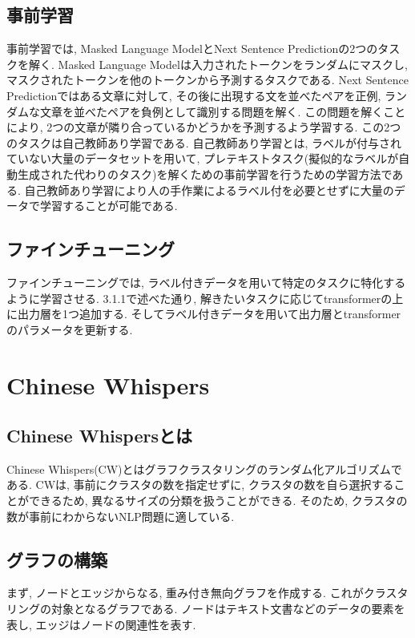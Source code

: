 \subsection{事前学習}
事前学習では, Masked Language ModelとNext Sentence Predictionの2つのタスクを解く. Masked Language Modelは入力されたトークンをランダムにマスクし, マスクされたトークンを他のトークンから予測するタスクである. Next Sentence Predictionではある文章に対して, その後に出現する文を並べたペアを正例, ランダムな文章を並べたペアを負例として識別する問題を解く. この問題を解くことにより, 2つの文章が隣り合っているかどうかを予測するよう学習する. 
この2つのタスクは自己教師あり学習である. 自己教師あり学習とは, ラベルが付与されていない大量のデータセットを用いて, プレテキストタスク(擬似的なラベルが自動生成された代わりのタスク)を解くための事前学習を行うための学習方法である. 自己教師あり学習により人の手作業によるラベル付を必要とせずに大量のデータで学習することが可能である. 

\subsection{ファインチューニング}
ファインチューニングでは, ラベル付きデータを用いて特定のタスクに特化するように学習させる. 3.1.1で述べた通り, 解きたいタスクに応じてtransformerの上に出力層を1つ追加する. そしてラベル付きデータを用いて出力層とtransformerのパラメータを更新する. 


\section{Chinese Whispers}
\subsection{Chinese Whispersとは}
Chinese Whispers(CW)\cite{chinese-whispers}とはグラフクラスタリングのランダム化アルゴリズムである. CWは, 事前にクラスタの数を指定せずに, クラスタの数を自ら選択することができるため, 異なるサイズの分類を扱うことができる. そのため, クラスタの数が事前にわからないNLP問題に適している. 

\subsection{グラフの構築}
まず, ノードとエッジからなる, 重み付き無向グラフを作成する. これがクラスタリングの対象となるグラフである. ノードはテキスト文書などのデータの要素を表し, エッジはノードの関連性を表す. 

